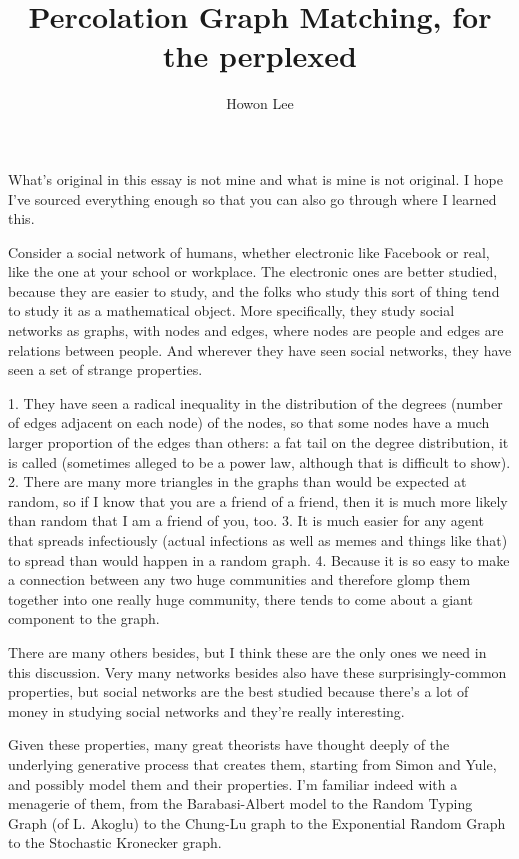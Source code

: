 \documentclass[12pt]{article}
\begin{document}
\title{Percolation Graph Matching, for the perplexed}
\author{Howon Lee}
\maketitle

What's original in this essay is not mine and what is mine is not original. I hope I've sourced everything enough so that you can also go through where I learned this.

Consider a social network of humans, whether electronic like Facebook or real, like the one at your school or workplace. The electronic ones are better studied, because they are easier to study, and the folks who study this sort of thing tend to study it as a mathematical object. More specifically, they study social networks as graphs, with nodes and edges, where nodes are people and edges are relations between people. And wherever they have seen social networks, they have seen a set of strange properties. 

1. They have seen a radical inequality in the distribution of the degrees (number of edges adjacent on each node) of the nodes, so that some nodes have a much larger proportion of the edges than others: a fat tail on the degree distribution, it is called (sometimes alleged to be a power law, although that is difficult to show).
2. There are many more triangles in the graphs than would be expected at random, so if I know that you are a friend of a friend, then it is much more likely than random that I am a friend of you, too.
3. It is much easier for any agent that spreads infectiously (actual infections as well as memes and things like that) to spread than would happen in a random graph.
4. Because it is so easy to make a connection between any two huge communities and therefore glomp them together into one really huge community, there tends to come about a giant component to the graph.

There are many others besides, but I think these are the only ones we need in this discussion. Very many networks besides also have these surprisingly-common properties, but social networks are the best studied because there's a lot of money in studying social networks and they're really interesting.

Given these properties, many great theorists have thought deeply of the underlying generative process that creates them, starting from Simon and Yule, and possibly model them and their properties. I'm familiar indeed with a menagerie of them, from the Barabasi-Albert model to the Random Typing Graph (of L. Akoglu) to the Chung-Lu graph to the Exponential Random Graph to the Stochastic Kronecker graph.
\end{document}
